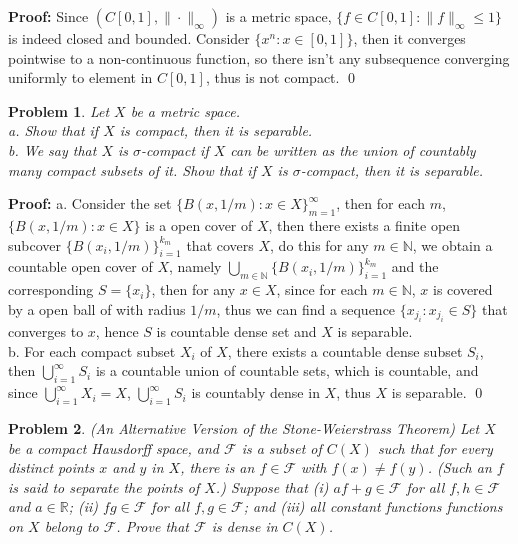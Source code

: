 \documentclass[12pt]{article}
\newtheorem{problem}{Problem}
\begin{document}
\textbf{Proof:} Since $(C[0,1], \|\cdot\|_\infty)$ is a metric space, $\{f\in C[0,1]: \|f\|_\infty\leq 1\}$ is indeed closed and bounded. Consider $\{x^n: x\in[0,1]\}$, then it converges pointwise to a non-continuous function, so there isn't any subsequence converging uniformly to element in $C[0,1]$, thus is not compact. \qed
\\
\begin{problem}
Let $X$ be a metric space. \\
\indent a. Show that if $X$ is compact, then it is separable. \\
\indent b. We say that $X$ is $\sigma$-compact if $X$ can be written as the union of countably many compact subsets of it. Show that if $X$ is $\sigma$-compact, then it is separable.
\end{problem}

\textbf{Proof:} a. Consider the set $\{B(x, 1/m): x\in X\}_{m=1}^{\infty}$, then for each $m$, $\{B(x, 1/m): x\in X\}$ is a open cover of $X$, then there exists a finite open subcover $\{B(x_i, 1/m)\}_{i=1}^{k_m}$ that covers $X$, do this for any $m\in\mathbb{N}$, we obtain a countable open cover of $X$, namely $\bigcup_{m\in\mathbb{N}}\{B(x_i, 1/m)\}_{i=1}^{k_m}$ and the corresponding $S=\{x_{i}\}$, then for any $x\in X$, since for each $m\in\mathbb{N}$, $x$ is covered by a open ball of with radius $1/m$, thus we can find a sequence $\{x_{j_i}: x_{j_i}\in S\}$ that converges to $x$, hence $S$ is countable dense set and $X$ is separable. \\
\indent b. For each compact subset $X_i$ of $X$, there exists a countable dense subset $S_i$, then $\bigcup_{i=1}^\infty S_i$ is a countable union of countable sets, which is countable, and since $\bigcup_{i=1}^\infty X_i=X$, $\bigcup_{i=1}^\infty S_i$ is countably dense in $X$, thus $X$ is separable. \qed
\\
\begin{problem}
(An Alternative Version of the Stone-Weierstrass Theorem) Let $X$ be a compact Hausdorff space, and $\mathcal{F}$ is a subset of $C(X)$ such that for every distinct points $x$ and $y$ in $X$, there is an $f\in\mathcal{F}$ with $f(x)\neq f(y)$. (Such an $f$ is said to separate the points of $X$.) Suppose that (i) $af+g\in\mathcal{F}$ for all $f,h\in\mathcal{F}$ and $a\in\mathbb{R}$; (ii) $fg\in\mathcal{F}$ for all $f,g\in\mathcal{F}$; and (iii) all constant functions functions on $X$ belong to $\mathcal{F}$. Prove that $\mathcal{F}$ is dense in $C(X)$. 
\end{problem}
\end{document}
